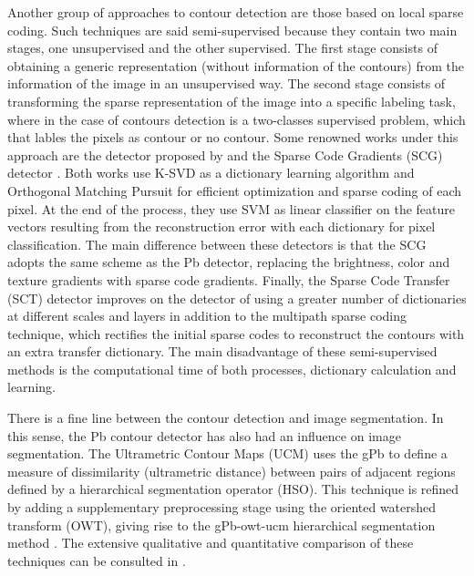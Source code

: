 Another group of approaches to contour detection are those based on local sparse coding. Such techniques are said semi-supervised because they contain two main stages, one unsupervised and the other supervised. The first stage consists of obtaining a generic representation (without information of the contours) from the information of the image in an unsupervised way. The second stage consists of transforming the sparse representation of the image into a specific labeling task, where in the case of contours detection is a two-classes supervised problem, which that lables the pixels as contour or no contour. Some renowned works under this approach are the detector proposed by \cite{Mairal.Leordeanu.ea:ECCV:2008} and the Sparse Code Gradients (SCG) detector \citep{Ren.Bo:NIPS:2012}. Both works use K-SVD as a dictionary learning algorithm and Orthogonal Matching Pursuit for efficient optimization and sparse coding of each pixel. At the end of the process, they use SVM as linear classifier on the feature vectors resulting from the reconstruction error with each dictionary for pixel classification. The main difference between these detectors is that the SCG adopts the same scheme as the Pb detector, replacing the brightness, color and texture gradients with sparse code gradients. Finally, the Sparse Code Transfer (SCT) detector \citep{Maire.Yu.ea:ACCV:2014} improves on the detector of \cite{Mairal.Leordeanu.ea:ECCV:2008} using a greater number of dictionaries at different scales and layers in addition to the multipath sparse coding technique, which rectifies the initial sparse codes to reconstruct the contours with an extra transfer dictionary. The main disadvantage of these semi-supervised methods is the computational time of both processes, dictionary calculation and learning.

There is a fine line between the contour detection and image segmentation. In this sense, the Pb contour detector has also had an influence on image segmentation. The Ultrametric Contour Maps (UCM) \citep{Arbelaez.Maire.ea:PR:2009} uses the gPb to define a measure of dissimilarity (ultrametric distance) between pairs of adjacent regions defined by a hierarchical segmentation operator (HSO). This technique is refined by adding a supplementary preprocessing stage using the oriented watershed transform (OWT), giving rise to the gPb-owt-ucm hierarchical segmentation method \citep{Arbelaez.Maire.ea:PR:2009}. The extensive qualitative and quantitative comparison of these techniques can be consulted in \citep{Arbelaez.Maire.ea:PAMI:2011}.

